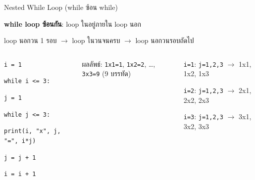 \documentclass[11pt, aspectratio=169]{beamer}
\newcommand{\py}[1]{\texttt{#1}}
\begin{document}
\begin{frame}{Nested While Loop (while ซ้อน while)}
  \begin{explanation}[แนวคิด]
    \textbf{while loop ซ้อนกัน}: loop ในอยู่ภายใน loop นอก

    loop นอกวน 1 รอบ $\rightarrow$ loop ในวนจนครบ $\rightarrow$ loop นอกวนรอบถัดไป
  \end{explanation}

  \begin{columns}[T]
      \begin{exambox}
        \py{i = 1}

        \py{while i <= 3:}

        \qquad \py{j = 1}

        \qquad \py{while j <= 3:}

        \qquad\quad \py{print(i, "x", j, "=", i*j)}

        \qquad\quad \py{j = j + 1}

        \qquad \py{i = i + 1}
      \end{exambox}

      ผลลัพธ์: \py{1x1=1}, \py{1x2=2}, \dots, \py{3x3=9} (9 บรรทัด)

      \begin{explanation}[การทำงาน]
        \py{i=1}: \py{j=1,2,3} $\rightarrow$ 1x1, 1x2, 1x3

        \py{i=2}: \py{j=1,2,3} $\rightarrow$ 2x1, 2x2, 2x3

        \py{i=3}: \py{j=1,2,3} $\rightarrow$ 3x1, 3x2, 3x3

      \end{explanation}
  \end{columns}
\end{frame}
\end{document}
